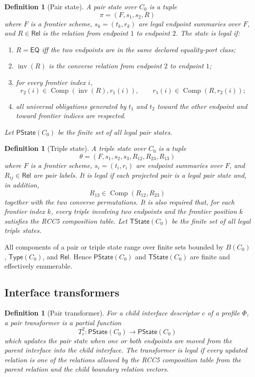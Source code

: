 \documentclass[11pt]{article}
\newtheorem{definition}[theorem]{Definition}
\newcommand{\Rel}{\mathsf{Rel}}
\newcommand{\EQ}{\mathsf{EQ}}
\newcommand{\Comp}{\operatorname{Comp}}
\newcommand{\Inv}{\operatorname{inv}}
\newcommand{\Typ}{\mathsf{Type}}
\begin{document}
\begin{definition}[Pair state]
A pair state over $C_0$ is a tuple
\[
  \pi=(F,s_1,s_2,R)
\]
where $F$ is a frontier scheme, $s_k=(t_k,r_k)$ are legal endpoint summaries over $F$, and $R\in\Rel$ is the relation from endpoint $1$ to endpoint $2$.  The state is legal if:
\begin{enumerate}[label=(PS\arabic*)]
\item $R=\EQ$ iff the two endpoints are in the same declared equality-port class;
\item $\Inv(R)$ is the converse relation from endpoint $2$ to endpoint $1$;
\item for every frontier index $i$,
\[
  r_2(i)\in\Comp(\Inv(R),r_1(i)),
  \qquad
  r_1(i)\in\Comp(R,r_2(i));
\]
\item all universal obligations generated by $t_1$ and $t_2$ toward the other endpoint and toward frontier indices are respected.
\end{enumerate}
Let $\mathsf{PState}(C_0)$ be the finite set of all legal pair states.
\end{definition}

\begin{definition}[Triple state]
A triple state over $C_0$ is a tuple
\[
  \theta=(F,s_1,s_2,s_3,R_{12},R_{23},R_{13})
\]
where $F$ is a frontier scheme, $s_i=(t_i,r_i)$ are endpoint summaries over $F$, and $R_{ij}\in\Rel$ are pair labels.  It is legal if each projected pair is a legal pair state and, in addition,
\[
  R_{13}\in\Comp(R_{12},R_{23})
\]
together with the two converse permutations.  It is also required that, for each frontier index $k$, every triple involving two endpoints and the frontier position $k$ satisfies the RCC5 composition table.  Let $\mathsf{TState}(C_0)$ be the finite set of all legal triple states.
\end{definition}

All components of a pair or triple state range over finite sets bounded by $B(C_0)$, $\Typ(C_0)$, and $\Rel$.  Hence $\mathsf{PState}(C_0)$ and $\mathsf{TState}(C_0)$ are finite and effectively enumerable.

\subsection{Interface transformers}

\begin{definition}[Pair transformer]
For a child interface descriptor $c$ of a profile $\Phi$, a pair transformer is a partial function
\[
  T^2_c:\mathsf{PState}(C_0)\to\mathsf{PState}(C_0)
\]
which updates the pair state when one or both endpoints are moved from the parent interface into the child interface.  The transformer is legal if every updated relation is one of the relations allowed by the RCC5 composition table from the parent relation and the child boundary relation vectors.
\end{definition}
\end{document}
